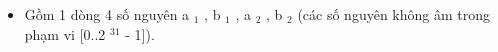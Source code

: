 \begin{itemize}
	\item Gồm 1 dòng 4 số nguyên a $_ 1 $ , b $_ 1 $ , a $_ 2 $ , b $_ 2 $ (các số nguyên không âm trong phạm vi [0..2 $^ 31 $ - 1]).
\end{itemize}

\